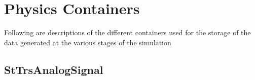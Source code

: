 \documentclass[twoside]{article}
\begin{document}
\section{Physics Containers}
\label{sec:containers}

Following are descriptions of the different containers used
for the storage of the data generated at the various stages
of the simulation

%
%
\subsection{StTrsAnalogSignal} 
\label{sec:stTrsAnalogSignal}
\end{document}
